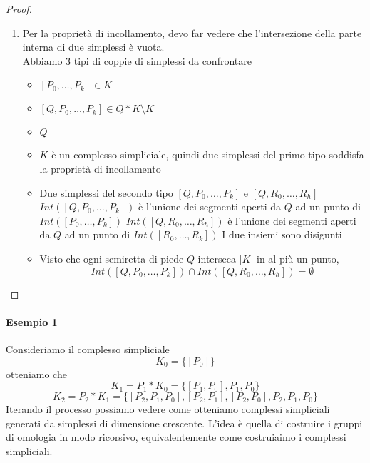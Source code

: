 \documentclass[a4paper]{report}
\begin{document}
\begin{proof}
\begin{enumerate}
\begin{center}
\begin{tikzpicture}[x=0.75pt,y=0.75pt,yscale=-1,xscale=1]
\end{tikzpicture}

            \end{center}
        \item Per la proprietà di incollamento, devo far vedere che l'intersezione della parte interna di due simplessi è vuota.\\
        Abbiamo 3 tipi di coppie di simplessi da confrontare
        \begin{itemize}
            \item $[P_0,\dots,P_k]\in K$
            \item $[Q,P_0,\dots,P_k]\in Q*K\setminus K$
            \item $Q$
        \end{itemize}
        \begin{itemize}
            \item $K$ è un complesso simpliciale, quindi due simplessi del primo tipo soddisfa la proprietà di incollamento
            \item Due simplessi del secondo tipo $[Q,P_0,\dots,P_k]$ e $[Q,R_0,\dots,R_h]$
                \subitem $Int([Q,P_0,\dots,P_k])$ è l'unione dei segmenti aperti da $Q$ ad un punto di $Int([P_0,\dots,P_k])$
                \subitem $Int([Q,R_0,\dots,R_h])$ è l'unione dei segmenti aperti da $Q$ ad un punto di $Int([R_0,\dots,R_k])$
            I due insiemi sono disigunti
            \item Visto che ogni semiretta di piede $Q$ interseca $|K|$ in al più un punto,
            \[
                Int([Q,P_0,\dots,P_k])\cap Int([Q,R_0,\dots,R_h])=\emptyset   
            \]
        \end{itemize}
    \end{enumerate}
\end{proof}
\paragraph{Esempio 1}
Consideriamo il complesso simpliciale
\[
    K_0=\{[P_0]\}    
\]
otteniamo che
\[
    K_1=P_1*K_0=\{[P_1,P_0],P_1,P_0\}
\]
\[
    K_2=P_2*K_1=\{[P_2,P_1,P_0],[P_2,P_1],[P_2,P_0],P_2,P_1,P_0\}
\]
Iterando il processo possiamo vedere come otteniamo complessi simpliciali generati da simplessi di dimensione crescente. L'idea è quella di costruire i gruppi di omologia in modo ricorsivo, equivalentemente come costruiaimo i complessi simpliciali.
\end{document}
